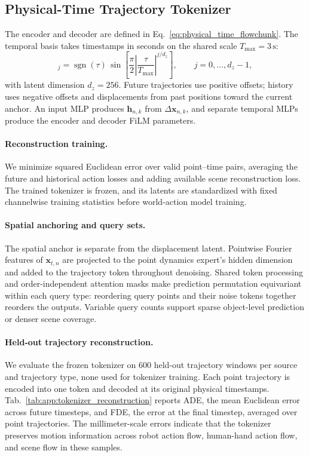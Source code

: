 \subsection{Physical-Time Trajectory Tokenizer}
\label{app:trajectory_tokenizer}

The encoder and decoder are defined in
Eq.~\eqref{eq:physical_time_flowchunk}.
The temporal basis takes timestamps in seconds on the shared scale
$T_{\max}=3\,\mathrm{s}$:
\begin{equation}
    [\boldsymbol\phi_{\mathrm{time}}(\tau)]_j
    =\operatorname{sgn}(\tau)\,
    \sin\!\left[\frac{\pi}{2}
    \left|\frac{\tau}{T_{\max}}\right|^{j/d_z}\right],
    \qquad j=0,\ldots,d_z-1,
\label{eq:tokenizer_time_basis}
\end{equation}
with latent dimension $d_z=256$.
Future trajectories use positive offsets; history uses negative offsets
and displacements from past positions toward the current anchor.
An input MLP produces $\mathbf h_{n,k}$ from $\Delta\mathbf x_{n,k}$, and
separate temporal MLPs produce the encoder and decoder FiLM parameters.

\paragraph{Reconstruction training.}
We minimize squared Euclidean error over valid point--time pairs,
averaging the future and historical action losses and adding available
scene reconstruction loss. The trained tokenizer is frozen, and its
latents are standardized with fixed channelwise training statistics
before world-action model training.

\paragraph{Spatial anchoring and query sets.}
The spatial anchor is separate from the displacement latent. Pointwise
Fourier features of $\mathbf x_{t,n}$ are projected to the point dynamics expert's
hidden dimension and added to the trajectory token throughout denoising.
Shared token processing and order-independent attention masks make
prediction permutation equivariant within each query type: reordering
query points and their noise tokens together reorders the outputs.
Variable query counts support sparse object-level prediction or denser
scene coverage.


\paragraph{Held-out trajectory reconstruction.}
We evaluate the frozen tokenizer on 600 held-out trajectory windows per
source and trajectory type, none used for tokenizer training. Each point
trajectory is encoded into one token and decoded at its original physical
timestamps. Tab.~\ref{tab:app:tokenizer_reconstruction} reports ADE,
the mean Euclidean error across future timesteps, and FDE, the error at
the final timestep, averaged over point trajectories. The millimeter-scale
errors indicate that the tokenizer preserves motion information across
robot action flow, human-hand action flow, and scene flow in these samples.

